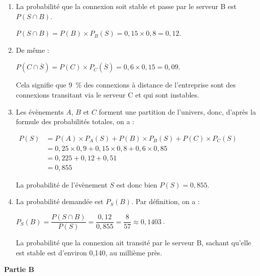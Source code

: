 \documentclass[10pt]{article}
\providecommand{\np}[2][]{{#2~#1}}
\begin{document}
\begin{enumerate}
-

















\item La probabilité que la connexion soit stable et passe par le serveur B est $P(S \cap B)$.

$P(S \cap B) = P(B) \times P_B(S) = 0,15 \times 0,8 = 0,12$.

\item De même :

$P\left(C \cap \overline{S}\right) = P(C) \times P_C\left(\overline{S}\right) = 0,6 \times 0,15 = 0,09$.

Cela signifie que 9~\% des connexions à distance de l'entreprise sont des connexions transitant via le serveur C et qui sont instables.

\item Les évènements $A$, $B$ et $C$ forment une partition de l'univers, donc, d'après la formule des probabilités totales, on a :

$\begin{aligned}
P(S) &= P(A) \times P_A(S)+ P(B) \times P_B(S) + P(C) \times P_C(S)\\
&= 0,25 \times 0,9 + 0,15 \times 0,8 + 0,6 \times 0,85 \\
&= 0,225 + 0,12 + 0,51\\
&= 0,855
\end{aligned}$

La probabilité de l'évènement $S$ est donc bien $P(S)=0,855$.

\item La probabilité demandée est $P_S(B)$.
Par définition, on a :

$P_S(B) = \dfrac{P(S\cap B)}{P(S)} = \dfrac{0,12}{0,855} = \dfrac{8}{57}\approx \np{0,1403}$.

La probabilité que la connexion ait transité par le serveur B, sachant qu'elle est stable est d'environ 0,140, au millième près.
\end{enumerate}


\textbf{Partie B}

\medskip
\end{document}
